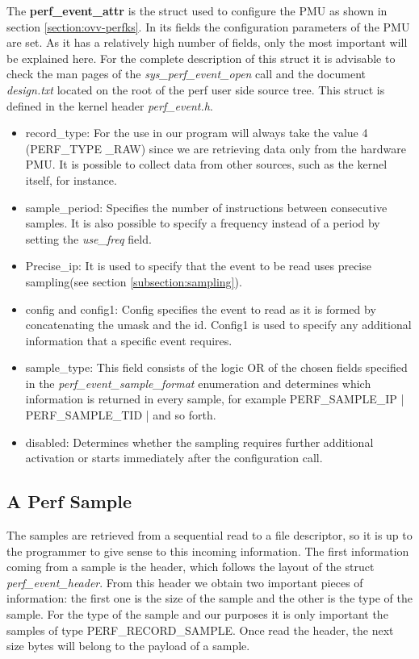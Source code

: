 The \textbf{perf\_event\_attr} is the struct used to configure the PMU as shown in section \ref{section:ovv-perfks}. In its fields the configuration parameters of the PMU are set. As it has a relatively high number of fields, only the most important will be explained here. For the complete description of this struct it is advisable to check the man pages of the \textit{sys\_perf\_event\_open} call and the document \textit{design.txt} located on the root of the perf user side source tree. This struct is defined in the kernel header \textit{perf\_event.h}. 
\begin{itemize}
	\item record\_type: For the use in our program will always take the value 4 (PERF\_TYPE \_RAW) since we are retrieving data only from the hardware PMU. It is possible to collect data from other sources, such as the kernel itself, for instance.
	\item sample\_period: Specifies the number of instructions between consecutive samples. It is also possible to specify a frequency instead of a period by setting the \textit{use\_freq} field.
	\item Precise\_ip: It is used to specify that the event to be read uses precise sampling(see section \ref{subsection:sampling}).
	\item config and config1: Config specifies the event to read as it is formed by concatenating the umask and the id. Config1 is used to specify any additional information that a specific event requires. 
	\item sample\_type: This field consists of the logic OR of the chosen fields specified in the \textit{perf\_event\_sample\_format} enumeration and determines which information is returned in every sample, for example PERF\_SAMPLE\_IP | PERF\_SAMPLE\_TID | and so forth.
	\item disabled: Determines whether the sampling requires further additional activation or starts immediately after the configuration call.
\end{itemize}
     
\subsection{A Perf Sample}\label{section:pf-samplu}
     
The samples are retrieved from a sequential read to a file descriptor, so it is up to the programmer to give sense to this incoming information. The first information coming from a sample is the header, which follows the layout of the struct \textit{perf\_event\_header}. From this header we obtain two important pieces of information: the first one is the size of the sample and the other is the type of the sample. For the type of the sample and our purposes it is only important the samples of type PERF\_RECORD\_SAMPLE. Once read the header, the next size bytes will belong to the payload of a sample.

